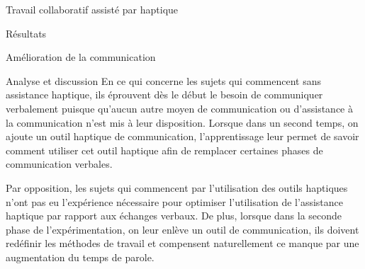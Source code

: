 \documentclass[myfrancais,ngerman,english,french]{mythesis}
\begin{document}
\begin{mychapter}{Travail collaboratif assisté par haptique}
\begin{mysection}{Résultats}
\begin{mysubsection}{Amélioration de la communication}
\begin{mysubsubsection}{Analyse et discussion}
					En ce qui concerne les sujets qui commencent sans assistance haptique, ils éprouvent dès le début le besoin de communiquer verbalement puisque qu'aucun autre moyen de communication ou d'assistance à la communication n'est mis à leur disposition.
					Lorsque dans un second temps, on ajoute un outil haptique de communication, l'apprentissage leur permet de savoir comment utiliser cet outil haptique afin de remplacer certaines phases de communication verbales.

					Par opposition, les sujets qui commencent par l'utilisation des outils haptiques n'ont pas eu l'expérience nécessaire pour optimiser l'utilisation de l'assistance haptique par rapport aux échanges verbaux.
					De plus, lorsque dans la seconde phase de l'expérimentation, on leur enlève un outil de communication, ils doivent redéfinir les méthodes de travail et compensent naturellement ce manque par une augmentation du temps de parole.


\end{mysubsubsection}
\end{mysubsection}
\end{mysection}
\end{mychapter}
\end{document}
